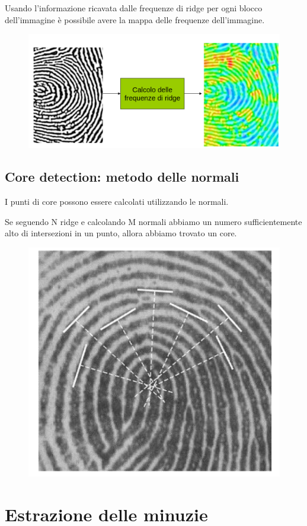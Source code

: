 Usando l’informazione ricavata dalle frequenze di
ridge per ogni blocco dell’immagine è possibile
avere la mappa delle frequenze dell’immagine.

\begin{figure}[ht]
    \centering
    \includegraphics[width=1\linewidth]{chapters/images-chap6/spazio-freq.png}
\end{figure}

\subsection{Core detection: metodo delle normali}

I punti di core possono essere calcolati utilizzando le normali.

Se seguendo N ridge e calcolando M normali abbiamo un numero sufficientemente
alto di intersezioni in un punto, allora abbiamo trovato un core.

\begin{figure}[ht]
    \centering
    \includegraphics[width=0.5\linewidth]{chapters/images-chap6/core-detection.png}
\end{figure}

\section{Estrazione delle minuzie}

